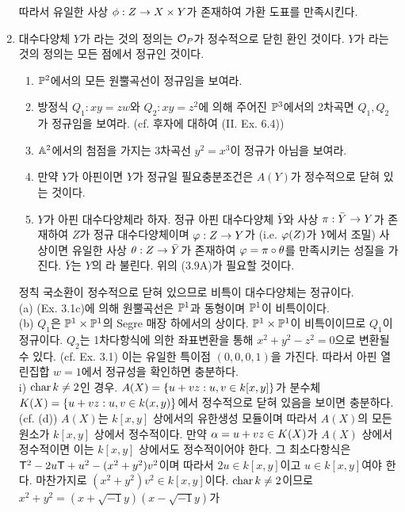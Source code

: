 \begin{enumerate}[label=\tb{3.\arabic*.},itemindent=0mm,itemsep=4mm]
		따라서 유일한 사상 $\phi:Z\rightarrow X\times Y$가 존재하여 가환 도표를 만족시킨다.
		\item {} 대수다양체 $Y$가 라는 것의 정의는
		$\mathcal{O}_P$가 정수적으로 닫힌 환인 것이다. $Y$가 라는 것의 정의는 모든 점에서 정규인 것이다.
		\begin{enumerate}[label=(\alph*)]
		\item $\mathbb{P}^2$에서의 모든 원뿔곡선이 정규임을 보여라.
		\item 방정식 $Q_1:xy=zw$와 $Q_2:xy=z^2$에 의해 주어진 $\mathbb{P}^3$에서의 2차곡면 $Q_1,Q_2$가 정규임을 보여라.
		(cf. 후자에 대하여 (II. Ex. 6.4))
		\item $\mathbb{A}^2$에서의 첨점을 가지는 3차곡선 $y^2=x^3$이 정규가 아님을 보여라.
		\item 만약 $Y$가 아핀이면 $Y$가 정규일 필요충분조건은 $A(Y)$가 정수적으로 닫혀 있는 것이다.
		\item $Y$가 아핀 대수다양체라 하자. 정규 아핀 대수다양체 $\bar Y$와 사상 $\pi:\bar Y\rightarrow Y$가 존재하여
		$Z$가 정규 대수다양체이며 $\varphi:Z\rightarrow Y$가 (i.e. $\varphi(Z)$가 $Y$에서 조밀) 사상이면
		유일한 사상 $\theta:Z\rightarrow\bar Y$가 존재하여 $\varphi=\pi\circ\theta$를 만족시키는 성질을 가진다.
		$\bar Y$는 $Y$의 라 불린다. 위의 (3.9A)가 필요할 것이다.
		\end{enumerate}
		\sol 정칙 국소환이 정수적으로 닫혀 있으므로 비특이 대수다양체는 정규이다.\\
		(a) (Ex. 3.1c)에 의해 원뿔곡선은 $\mathbb{P}^1$과 동형이며 $\mathbb{P}^1$이 비특이이다.\\
		(b) $Q_1$은 $\mathbb{P}^1\times\mathbb{P}^1$의 Segre 매장 하에서의 상이다. $\mathbb{P}^1\times\mathbb{P}^1$이 비특이이므로 $Q_1$이 정규이다.
		$Q_2$는 1차다항식에 의한 좌표변환을 통해 $x^2+y^2-z^2=0$으로 변환될 수 있다. (cf. Ex. 3.1)
		이는 유일한 특이점 $(0,0,0,1)$을 가진다. 따라서 아핀 열린집합 $w=1$에서 정규성을 확인하면 충분하다.\\
		i) $\operatorname{char} k\ne 2$인 경우.
		$A(X)=\{u+vz:u,v\in k[x,y]\}$가 분수체 $K(X)=\{u+vz:u,v\in k(x,y)\}$에서 정수적으로 닫혀 있음을 보이면 충분하다.
		(cf. (d)) $A(X)$는 $k[x,y]$ 상에서의 유한생성 모듈이며 따라서 $A(X)$의 모든 원소가 $k[x,y]$ 상에서 정수적이다.
		만약 $\alpha=u+vz\in K(X)$가 $A(X)$ 상에서 정수적이면 이는 $k[x,y]$ 상에서도 정수적이어야 한다.
		그 최소다항식은 $\mathsf{T}^2-2u\mathsf{T}+u^2-(x^2+y^2)v^2$이며 따라서 $2u\in k[x,y]$이고 $u\in k[x,y]$여야 한다.
		마찬가지로 $(x^2+y^2)v^2\in k[x,y]$이다. $\operatorname{char} k\ne 2$이므로 $x^2+y^2=(x+\sqrt{-1}y)(x-\sqrt{-1}y)$가

\end{enumerate}
